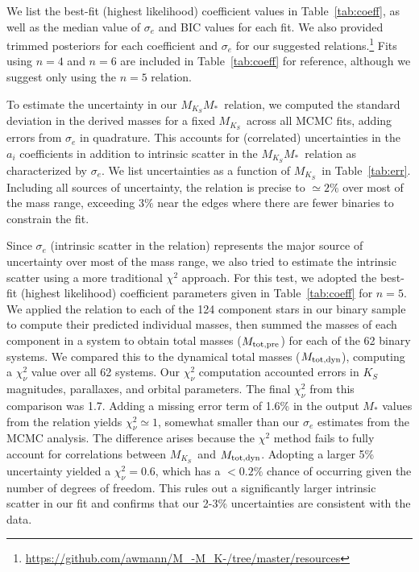 \documentclass[twocolumn]{aastex62}
\newcommand{\mks}{$M_{K_S}$}
\newcommand{\mmk}{$M_{K_S}$\textendash$M_*$}
\newcommand{\order}{5}
\newcommand{\mpred}{$M_{\rm{tot,pre}}$}
\newcommand{\mdyn}{$M_{\rm{tot,dyn}}$}
\begin{document}
We list the best-fit (highest likelihood) coefficient values in Table~\ref{tab:coeff}, as well as the median value of $\sigma_e$ and BIC values for each fit. We also provided trimmed posteriors for each coefficient and $\sigma_e$ for our suggested relations.\footnote{\href{https://github.com/awmann/M_-M_K-/tree/master/resources}{https://github.com/awmann/M\_-M\_K-/tree/master/resources}} Fits using $n=4$ and $n=6$ are included in Table~\ref{tab:coeff} for reference, although we suggest only using the $n=\order$ relation. 

To estimate the uncertainty in our \mmk\ relation, we computed the standard deviation in the derived masses for a fixed \mks\ across all MCMC fits, adding errors from $\sigma_e$ in quadrature. This accounts for (correlated) uncertainties in the $a_i$ coefficients in addition to intrinsic scatter in the \mmk\ relation as characterized by $\sigma_e$. We list uncertainties as a function of \mks\ in Table~\ref{tab:err}. Including all sources of uncertainty, the relation is precise to $\simeq2\%$ over most of the mass range, exceeding $3\%$ near the edges where there are fewer binaries to constrain the fit. 

Since $\sigma_e$ (intrinsic scatter in the relation) represents the major source of uncertainty over most of the mass range, we also tried to estimate the intrinsic scatter using a more traditional $\chi^2$ approach. For this test, we adopted the best-fit (highest likelihood) coefficient parameters given in Table~\ref{tab:coeff} for $n=\order$. We applied the relation to each of the 124 component stars in our binary sample to compute their predicted individual masses, then summed the masses of each component in a system to obtain total masses (\mpred) for each of the 62 binary systems. We compared this to the dynamical total masses (\mdyn), computing a $\chi^2_\nu$ value over all 62 systems. Our $\chi^2_\nu$ computation accounted errors in $K_S$ magnitudes, parallaxes, and orbital parameters. The final $\chi^2_\nu$ from this comparison was 1.7. Adding a missing error term of 1.6\% in the output $M_*$ values from the relation yields $\chi^2_\nu \simeq 1$, somewhat smaller than our $\sigma_e$ estimates from the MCMC analysis. The difference arises because the $\chi^2$ method fails to fully account for correlations between \mks\ and \mdyn. Adopting a larger 5\% uncertainty yielded a $\chi^2_\nu=0.6$, which has a $<0.2\%$ chance of occurring given the number of degrees of freedom. This rules out a significantly larger intrinsic scatter in our fit and confirms that our 2-3\% uncertainties are consistent with the data. 
\end{document}
